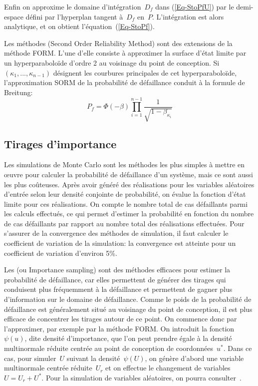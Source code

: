 Enfin on approxime le domaine d'intégration~$D_f$ dans (\ref{Eq-StoPfU}) par le demi-espace défini par l'hyperplan tangent à~$D_f$ en~$P$. L'intégration est alors analytique, et on obtient l'équation~(\ref{Eq-StoPf}).

\medskip
Les méthodes  (Second Order Reliability Method) sont des extensions de la méthode FORM. 
L'une d'elle consiste à approximer la surface d'état limite par un hyperparaboloïde d'ordre 2 au voisinage du point de conception. Si~$(\kappa_1, ..., \kappa_{n-1})$ désignent les courbures principales de cet hyperparaboloïde, l'approximation SORM de la probabilité de défaillance conduit à la formule de Breitung:
\begin{equation}
P_f = \Phi(-\beta)\prod_{i=1}^{n-1}\dfrac1{\sqrt{1-\beta_{\kappa_i}}}
\end{equation}

\medskip
\subsection{Tirages d'importance}

Les simulations de Monte Carlo sont les méthodes les plus simples à mettre en œuvre pour calculer la probabilité de défaillance d'un système, mais ce sont aussi les plus coûteuses. Après avoir généré des réalisations pour les variables aléatoires d'entrée selon leur densité conjointe de probabilité, on évalue la fonction d'état limite pour ces réalisations. On compte le nombre total de cas défaillants parmi les calculs effectués, ce qui permet d'estimer la probabilité en fonction du nombre de cas défaillants par rapport au nombre total des réalisations effectuées. Pour s'assurer de la convergence des méthodes de simulation, il faut calculer le coefficient de variation de la simulation: la convergence est atteinte pour un coefficient de variation d'environ 5\%.

Les  (ou Importance sampling) sont des méthodes efficaces pour estimer la probabilité de défaillance, car elles permettent de générer des tirages qui conduisent plus fréquemment à la défaillance et permettent de gagner plus d'information sur le domaine de défaillance.
Comme le poids de la probabilité de défaillance est généralement situé au voisinage du point de conception, il est plus efficace de concentrer les tirages autour de ce point. On commence donc par l'approximer, par exemple par la méthode FORM. On introduit la fonction~$\psi(u)$, dite densité d'importance, que l'on peut prendre égale à la densité multinormale réduite centrée au point de conception de coordonnées~$u^*$. Dans ce cas, pour simuler~$U$ suivant la densité~$\psi(U)$, on génère d'abord une variable multinormale centrée réduite~$U_r$ et on effectue le changement de variables~$U=U_r+U^*$. Pour la simulation de variables aléatoires, on pourra consulter~\cite{bib-Krikorian}.


